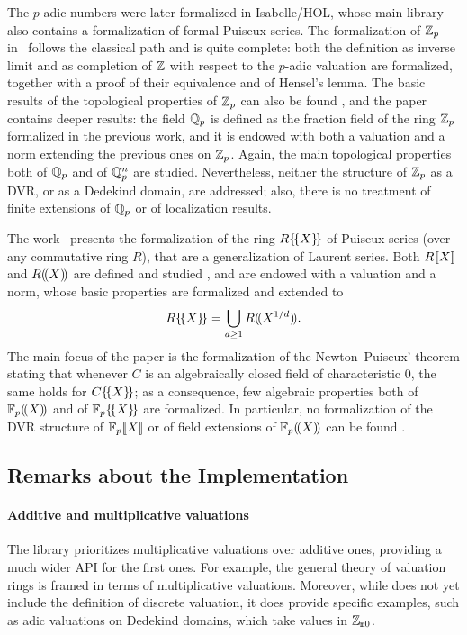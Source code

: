 \documentclass[sigplan,screen]{acmart}
\begin{document}
The $p$-adic numbers were later formalized in Isabelle/HOL, whose main library also contains a formalization of formal Puiseux series. The formalization of $\ZZ_p$ in~\cite{padicIntIsa} follows the classical path and is quite complete: both the definition as inverse limit and as completion of $\ZZ$ with respect to the $p$-adic valuation are formalized, together with a proof of their equivalence and of Hensel's lemma. The basic results of the topological properties of $\ZZ_p$ can also be found \ibid, and the paper~\cite{padicIsa} contains deeper results: the field $\QQ_p$ is defined as the fraction field of the ring $\ZZ_p$ formalized in the previous work, and it is endowed with both a valuation and a norm extending the previous ones on $\ZZ_p$. Again, the main topological properties both of $\QQ_p$ and of $\QQ_p^n$ are studied. Nevertheless, neither the structure of $\ZZ_p$ as a DVR, or as a Dedekind domain, are addressed; also, there is no treatment of finite extensions of $\QQ_p$ or of localization results.

The work~\cite{PuiseuxSeriesIsa} presents the formalization of the ring $\puiseuxseries$ of Puiseux series (over any commutative ring $R$), that are a generalization of Laurent series. Both $\powerseries[R]$ and $\laurentseries[R]$ are defined and studied \ibid, and are endowed with a valuation and a norm, whose basic properties are formalized and extended to
\[
\puiseuxseries=\bigcup_{d\geq 1}R(\!(X^{1/d})\!).
\]
The main focus of the paper is the formalization of the Newton--Puiseux' theorem stating that whenever $C$ is an algebraically closed field of characteristic $0$, the same holds for $\puiseuxseries[C]$; as a consequence, few algebraic properties both of $\laurentseries[\FF]$ and of $\puiseuxseries[\FF]$ are formalized. In particular, no formalization of the DVR structure of $\powerseries[\FF]$ or of field extensions of $\laurentseries[\FF]$ can be found \ibid.


\subsection{Remarks about the Implementation}\label{subsec:implementation}

\paragraph{Additive and multiplicative valuations}
The \mathlib library prioritizes multiplicative valuations over additive ones, providing a much wider API for the first ones. For example, the general theory of valuation rings\href{https://leanprover-community.github.io/mathlib_docs/ring_theory/valuation/valuation_ring.html#valuation_ring.valuation}{\extlink} is framed in terms of multiplicative valuations. Moreover, while \mathlib does not yet include the definition of discrete valuation, it does provide specific examples, such as adic valuations on Dedekind domains, which take values in $\wzmZZ$.
\end{document}
